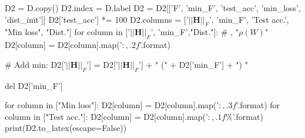 D2 = D.copy()
D2.index = D.label
D2 = D2[['F', 'min_F', 'test_acc', 'min_loss', 'dist_init']]
D2['test_acc'] *= 100
D2.columns = ['$||\mathbf{H}||_F$', 'min_F', 'Test acc.', "Min loss", "Dist."]
for column in ['$||\mathbf{H}||_F$', 'min_F',"Dist."]: # , "$\rho(W)$"
    D2[column] = D2[column].map('${:,.2f}$'.format)
    
    
# Add min:
D2['$||\mathbf{H}||_F$'] = D2['$||\mathbf{H}||_F$'] + " (" + D2['min_F'] + ") "

del D2['min_F']
    
for column in ["Min loss"]:
    D2[column] = D2[column].map('${:,.3f}$'.format)
for column in ["Test acc."]:
    D2[column] = D2[column].map('${:,.1f}\%$'.format)
print(D2.to_latex(escape=False))



